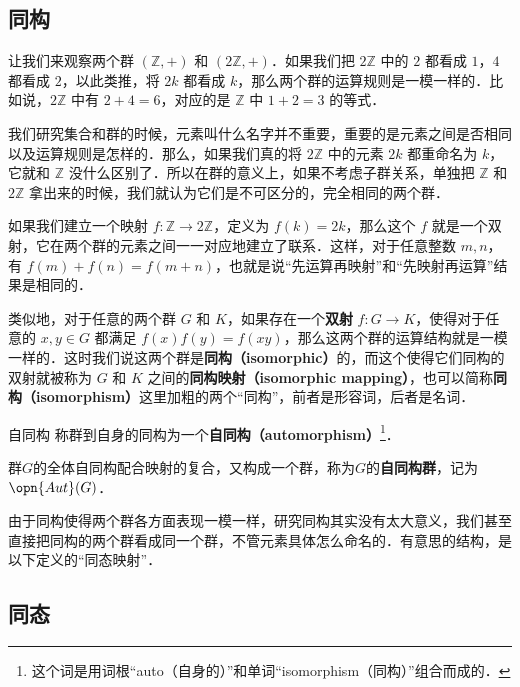 

\subsection{同构}

让我们来观察两个群 $(\mathbb{Z}, +)$ 和 $(2\mathbb{Z},+)$．如果我们把 $2\mathbb{Z}$ 中的 $2$ 都看成 $1$，$4$ 都看成 $2$，以此类推，将 $2k$ 都看成 $k$，那么两个群的运算规则是一模一样的．比如说，$2\mathbb{Z}$ 中有 $2+4=6$，对应的是 $\mathbb{Z}$ 中 $1+2=3$ 的等式．

我们研究集合和群的时候，元素叫什么名字并不重要，重要的是元素之间是否相同以及运算规则是怎样的．那么，如果我们真的将 $2\mathbb{Z}$ 中的元素 $2k$ 都重命名为 $k$，它就和 $\mathbb{Z}$ 没什么区别了．所以在群的意义上，如果不考虑子群关系，单独把 $\mathbb{Z}$ 和 $2\mathbb{Z}$ 拿出来的时候，我们就认为它们是不可区分的，完全相同的两个群．

如果我们建立一个映射 $f:\mathbb{Z}\rightarrow2\mathbb{Z}$，定义为 $f(k)=2k$，那么这个 $f$ 就是一个双射，它在两个群的元素之间一一对应地建立了联系．这样，对于任意整数 $m, n$，有 $f(m)+f(n)=f(m+n)$，也就是说“先运算再映射”和“先映射再运算”结果是相同的．

类似地，对于任意的两个群 $G$ 和 $K$，如果存在一个\textbf{双射} $f:G\rightarrow K$，使得对于任意的 $x, y\in G$ 都满足 $f(x)f(y)=f(xy)$，那么这两个群的运算结构就是一模一样的．这时我们说这两个群是\textbf{同构（isomorphic）}的，而这个使得它们同构的双射就被称为 $G$ 和 $K$ 之间的\textbf{同构映射（isomorphic mapping）}，也可以简称\textbf{同构（isomorphism）}这里加粗的两个“同构”，前者是形容词，后者是名词．

\begin{definition}{自同构}
称群到自身的同构为一个\textbf{自同构（automorphism）}\footnote{这个词是用词根“auto（自身的）”和单词“isomorphism（同构）”组合而成的．}．


群$G$的全体自同构配合映射的复合，又构成一个群，称为$G$的\textbf{自同构群}，记为$\opn{Aut}(G)$．


\end{definition}

由于同构使得两个群各方面表现一模一样，研究同构其实没有太大意义，我们甚至直接把同构的两个群看成同一个群，不管元素具体怎么命名的．有意思的结构，是以下定义的“同态映射”．

\subsection{同态}

